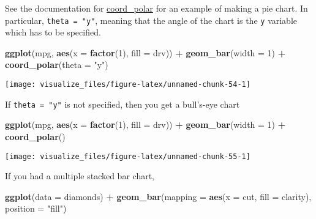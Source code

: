 \documentclass[]{book}
\newenvironment{Shaded}{\begin{snugshade}}{\end{snugshade}}
\newcommand{\DataTypeTok}[1]{\textcolor[rgb]{0.13,0.29,0.53}{#1}}
\newcommand{\DecValTok}[1]{\textcolor[rgb]{0.00,0.00,0.81}{#1}}
\newcommand{\KeywordTok}[1]{\textcolor[rgb]{0.13,0.29,0.53}{\textbf{#1}}}
\newcommand{\NormalTok}[1]{#1}
\newcommand{\OperatorTok}[1]{\textcolor[rgb]{0.81,0.36,0.00}{\textbf{#1}}}
\newcommand{\StringTok}[1]{\textcolor[rgb]{0.31,0.60,0.02}{#1}}
\theoremstyle{plain}
\theoremstyle{remark}
\begin{document}
See the documentation for
\href{http://docs.ggplot2.org/current/coord_polar.html}{coord\_polar}
for an example of making a pie chart. In particular,
\texttt{theta\ =\ "y"}, meaning that the angle of the chart is the
\texttt{y} variable which has to be specified.

\begin{Shaded}
\begin{Highlighting}[]
\KeywordTok{ggplot}\NormalTok{(mpg, }\KeywordTok{aes}\NormalTok{(}\DataTypeTok{x =} \KeywordTok{factor}\NormalTok{(}\DecValTok{1}\NormalTok{), }\DataTypeTok{fill =}\NormalTok{ drv)) }\OperatorTok{+}
\StringTok{  }\KeywordTok{geom_bar}\NormalTok{(}\DataTypeTok{width =} \DecValTok{1}\NormalTok{) }\OperatorTok{+}
\StringTok{  }\KeywordTok{coord_polar}\NormalTok{(}\DataTypeTok{theta =} \StringTok{"y"}\NormalTok{)}
\end{Highlighting}
\end{Shaded}

\begin{center}\texttt{[image: visualize\_files/figure-latex/unnamed-chunk-54-1]} \end{center}

If \texttt{theta\ =\ "y"} is not specified, then you get a bull's-eye
chart

\begin{Shaded}
\begin{Highlighting}[]
\KeywordTok{ggplot}\NormalTok{(mpg, }\KeywordTok{aes}\NormalTok{(}\DataTypeTok{x =} \KeywordTok{factor}\NormalTok{(}\DecValTok{1}\NormalTok{), }\DataTypeTok{fill =}\NormalTok{ drv)) }\OperatorTok{+}
\StringTok{  }\KeywordTok{geom_bar}\NormalTok{(}\DataTypeTok{width =} \DecValTok{1}\NormalTok{) }\OperatorTok{+}
\StringTok{  }\KeywordTok{coord_polar}\NormalTok{()}
\end{Highlighting}
\end{Shaded}

\begin{center}\texttt{[image: visualize\_files/figure-latex/unnamed-chunk-55-1]} \end{center}

If you had a multiple stacked bar chart,

\begin{Shaded}
\begin{Highlighting}[]
\KeywordTok{ggplot}\NormalTok{(}\DataTypeTok{data =}\NormalTok{ diamonds) }\OperatorTok{+}
\StringTok{  }\KeywordTok{geom_bar}\NormalTok{(}\DataTypeTok{mapping =} \KeywordTok{aes}\NormalTok{(}\DataTypeTok{x =}\NormalTok{ cut, }\DataTypeTok{fill =}\NormalTok{ clarity), }\DataTypeTok{position =} \StringTok{"fill"}\NormalTok{)}
\end{Highlighting}
\end{Shaded}
\end{document}
